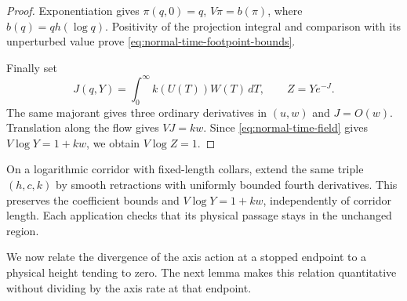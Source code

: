 \begin{proof}
Exponentiation gives \(\pi(q,0)=q\), \(V\pi=b(\pi)\), where
\(b(q)=qh(\log q)\). Positivity of the projection integral and
comparison with its unperturbed value prove
\eqref{eq:normal-time-footpoint-bounds}.

Finally set
\begin{equation}\label{eq:normal-time-integrating-coordinate}
 J(q,Y)=\int_0^\infty k(U(T))W(T)\,dT,
 \qquad Z=Ye^{-J}.
\end{equation}
The same majorant gives three ordinary derivatives in \((u,w)\)
and \(J=O(w)\).  Translation along the flow gives \(VJ=kw\).
Since \eqref{eq:normal-time-field} gives
\(V\log Y=1+kw\), we obtain \(V\log Z=1\).
\end{proof}

On a logarithmic corridor with fixed-length collars, extend the same
triple \((h,c,k)\) by smooth retractions with uniformly bounded
fourth derivatives. This preserves the coefficient bounds and
\(V\log Y=1+kw\), independently of corridor length. Each application
checks that its physical passage stays in the unchanged region.

We now relate the divergence of the axis action at a stopped endpoint
to a physical height tending to zero. The next lemma makes this relation
quantitative without dividing by the axis rate at that endpoint.

